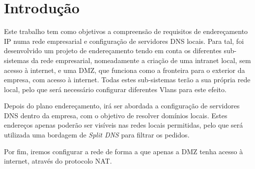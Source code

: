 \chapter{Introdução}

Este trabalho tem como objetivos a compreensão de requisitos de endereçamento IP numa rede empresarial e configuração de servidores DNS locais.
Para tal, foi desenvolvido um projeto de endereçamento tendo em conta os diferentes sub-sistemas da rede empresarial,
nomeadamente a criação de uma intranet local, sem acesso à internet, e uma DMZ, que funciona como a fronteira para o exterior da empresa, com acesso à internet.
Todas estes sub-sistemas terão a sua própria rede local, pelo que será necessário configurar diferentes Vlans para este efeito.

Depois do plano endereçamento, irá ser abordada a configuração de servidores DNS dentro da empresa, com o objetivo de resolver domínios locais.
Estes endereços apenas poderão ser visíveis nas redes locais permitidas, pelo que será utilizada uma bordagem de \textit{Split DNS} para filtrar os pedidos.

Por fim, iremos configurar a rede de forma a que apenas a DMZ tenha acesso à internet, através do protocolo NAT.

